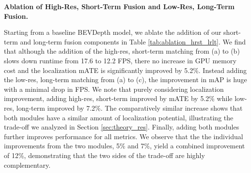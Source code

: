 \documentclass[runningheads, hyperfootnotes=false]{article}
\begin{document}
\noindent\textbf{Ablation of High-Res, Short-Term Fusion and Low-Res, Long-Term Fusion.}
\begin{table*}
\centering
\captionsetup{aboveskip=0pt}\captionsetup{belowskip=0pt}
\label{tab:ablation_hrst_lrlt}
\tiny
{}
\end{table*} Starting from a baseline BEVDepth model, we ablate the addition of our short-term and long-term fusion components in Table \ref{tab:ablation_hrst_lrlt}. We find that although the addition of the high-res, short-term matching from (a) to (b) slows down runtime from 17.6 to 12.2 FPS, there no increase in GPU memory cost and the localization mATE is significantly improved by 5.2\%. Instead adding the low-res, long-term matching from (a) to (c), the improvement in mAP is huge with a minimal drop in FPS. We note that purely considering localization improvement, adding high-res, short-term improved by mATE by 5.2\% while low-res, long-term improved by 7.2\%. The comparatively similar increase shows that both modules have a similar amount of localization potential, illustrating the trade-off we analyzed in Section \ref{sec:theory_res}. Finally, adding both modules further improves performance for all metrics. We observe that the the individual improvements from the two modules, 5\% and 7\%, yield a combined improvement of 12\%, demonstrating that the two sides of the trade-off are highly complementary.
\end{document}
